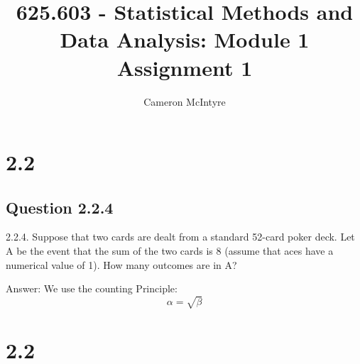 \documentclass[11pt, oneside]{article}   	%
\title{625.603 - Statistical Methods and Data Analysis:
Module 1 Assignment 1}
\author{Cameron McIntyre}
\begin{document}
\maketitle

\section{2.2}
\subsection{ Question 2.2.4}

2.2.4. Suppose that two cards are dealt from a standard 52-card poker deck. Let A be the event that the sum of the two cards is 8 (assume that aces have a numerical value of 1). How many outcomes are in A?

Answer:
We use the counting Principle:
\begin{equation}
    \label{simple_equation}
    \alpha = \sqrt{ \beta }
\end{equation}
\section{2.2}
\end{document}
